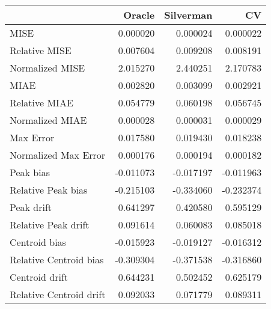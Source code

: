 \begin{tabular}{lrrr}
  \hline
 & Oracle & Silverman & CV \\ 
  \hline
MISE & 0.000020 & 0.000024 & 0.000022 \\ 
  Relative MISE & 0.007604 & 0.009208 & 0.008191 \\ 
  Normalized MISE & 2.015270 & 2.440251 & 2.170783 \\ 
  MIAE & 0.002820 & 0.003099 & 0.002921 \\ 
  Relative MIAE & 0.054779 & 0.060198 & 0.056745 \\ 
  Normalized MIAE & 0.000028 & 0.000031 & 0.000029 \\ 
  Max Error & 0.017580 & 0.019430 & 0.018238 \\ 
  Normalized Max Error & 0.000176 & 0.000194 & 0.000182 \\ 
  Peak bias & -0.011073 & -0.017197 & -0.011963 \\ 
  Relative Peak bias & -0.215103 & -0.334060 & -0.232374 \\ 
  Peak drift & 0.641297 & 0.420580 & 0.595129 \\ 
  Relative Peak drift & 0.091614 & 0.060083 & 0.085018 \\ 
  Centroid bias & -0.015923 & -0.019127 & -0.016312 \\ 
  Relative Centroid bias & -0.309304 & -0.371538 & -0.316860 \\ 
  Centroid drift & 0.644231 & 0.502452 & 0.625179 \\ 
  Relative Centroid drift & 0.092033 & 0.071779 & 0.089311 \\ 
   \hline
\end{tabular}
